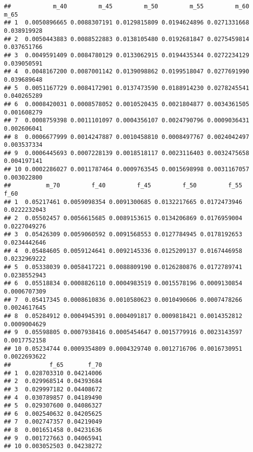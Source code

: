 \documentclass[
]{article}
\begin{document}
\begin{verbatim}
##            m_40         m_45         m_50         m_55         m_60        m_65
## 1  0.0050896665 0.0088307191 0.0129815809 0.0194624896 0.0271331668 0.038919928
## 2  0.0050443883 0.0088522883 0.0138105480 0.0192681847 0.0275459814 0.037651766
## 3  0.0049591409 0.0084780129 0.0133062915 0.0194435344 0.0272234129 0.039050591
## 4  0.0048167200 0.0087001142 0.0139098862 0.0199518047 0.0277691990 0.039689648
## 5  0.0051167729 0.0084172901 0.0137473590 0.0188914230 0.0278245541 0.040265289
## 6  0.0008420031 0.0008578052 0.0010520435 0.0021804877 0.0034361505 0.001608279
## 7  0.0008759398 0.0011101097 0.0004356107 0.0024790796 0.0009036431 0.002606041
## 8  0.0006677999 0.0014247887 0.0010458810 0.0008497767 0.0024042497 0.003537334
## 9  0.0006445693 0.0007228139 0.0018518117 0.0023116403 0.0032475658 0.004197141
## 10 0.0002286027 0.0011787464 0.0009763545 0.0015698998 0.0031167057 0.003022800
##          m_70         f_40         f_45         f_50         f_55         f_60
## 1  0.05217461 0.0059098354 0.0091300685 0.0132217665 0.0172473946 0.0222232043
## 2  0.05502457 0.0056615685 0.0089153615 0.0134206869 0.0176959004 0.0227049276
## 3  0.05426309 0.0059060592 0.0091568553 0.0127784945 0.0178192653 0.0234442646
## 4  0.05484605 0.0059124641 0.0092145336 0.0125209137 0.0167446958 0.0232969222
## 5  0.05338039 0.0058417221 0.0088809190 0.0126280876 0.0172789741 0.0238552943
## 6  0.05518834 0.0008826110 0.0004983519 0.0015578196 0.0009130854 0.0006707309
## 7  0.05417345 0.0008610836 0.0010580623 0.0010490606 0.0007478266 0.0024617645
## 8  0.05284912 0.0004945391 0.0004091817 0.0009818421 0.0014352812 0.0009004629
## 9  0.05598805 0.0007938416 0.0005454647 0.0015779916 0.0023143597 0.0017752158
## 10 0.05234744 0.0009354809 0.0004329740 0.0012716706 0.0016730951 0.0022693622
##           f_65       f_70
## 1  0.028703310 0.04214006
## 2  0.029968514 0.04393684
## 3  0.029997182 0.04408672
## 4  0.030789857 0.04189490
## 5  0.029307600 0.04086327
## 6  0.002540632 0.04205625
## 7  0.002747357 0.04219049
## 8  0.001651458 0.04231636
## 9  0.001727663 0.04065941
## 10 0.003052503 0.04238272
\end{verbatim}
\end{document}
